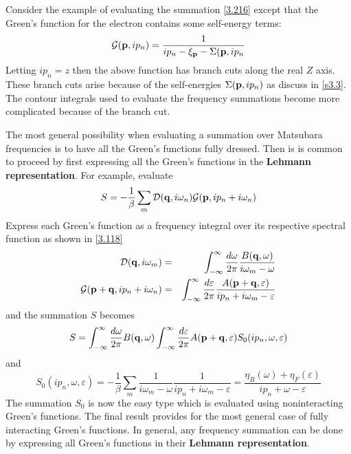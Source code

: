 Consider the example of evaluating the summation \eqref{3.216} except that the Green's function for the electron contains some self-energy terms:
\begin{equation}
    \mathcal{G}(\mathbf{p},ip_n) = \frac{1}{ip_n -\xi_{\mathbf{p}} -\Sigma(\mathbf{p},ip_n} \label{3.241}
\end{equation}
Letting $ip_n =z$ then the above function has branch cuts along the real $Z$ axis.
These branch cuts arise because of the self-energies $\Sigma(\mathbf{p},ip_n)$ as discuss in \ref{s3.3}.
The contour integrals used to evaluate the frequency summations become more complicated because of the branch cut.

The most general possibility when evaluating a summation over Matsubara frequencies is to have all the Green's functions fully dressed.
Then is is common to proceed by first expressing all the Green's functions in the \textbf{Lehmann representation}.
For example, evaluate
\begin{equation}
    S = - \frac{1}{\beta} \sum_m \mathcal{D}(\mathbf{q},i\omega_n) \mathcal{G}(\mathbf{p},ip_n + i\omega_n) \label{3.242}
\end{equation}
Express each Green's function as a frequency integral over its respective spectral function as shown in \eqref{3.118}
\begin{eqnarray}
    \mathcal{D} (\mathbf{q},i\omega_m) &=& \int_{-\infty}^\infty \frac{d\omega}{2\pi} \frac{B(\mathbf{q},\omega)}{i\omega_m-\omega}  \label{3.243} \\
    \mathcal{G} (\mathbf{p}+\mathbf{q},ip_n+i\omega_n) &=& \int_{-\infty}^\infty \frac{d \varepsilon}{2\pi}  \frac{A(\mathbf{p}+\mathbf{q}, \varepsilon)}{ip_n + i\omega_m -\varepsilon} \label{3.244}
\end{eqnarray}
and the summation $S$ becomes
\begin{equation}
    S = \int_{-\infty}^\infty \frac{d\omega}{2\pi} B(\mathbf{q},\omega) \int_{-\infty}^\infty \frac{d\varepsilon}{2\pi} A(\mathbf{p}+ \mathbf{q},\varepsilon) S_0(ip_n,\omega,\varepsilon) \nonumber
\end{equation}
and
\begin{equation}
    S_0(ip_n,\omega,\varepsilon) = - \frac{1}{\beta} \sum_m \frac{1}{i\omega_m-\omega} \frac{1}{ip_n+i\omega_m-\varepsilon} = \frac{\eta_B(\omega) + \eta_F(\varepsilon)}{ip_n+\omega-\varepsilon}  \nonumber
\end{equation}
The summation $S_0$ is now the easy type which is evaluated using noninteracting Green's functions.
The final result provides for the most general case of fully interacting Green's functions.
In general, any frequency summation can be done by expressing all Green's functions in their \textbf{Lehmann representation}.

